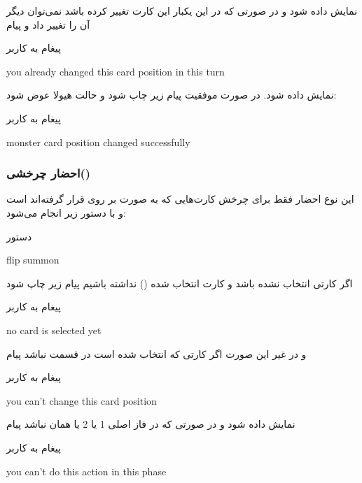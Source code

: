 \documentclass[]{article}
\begin{document}
نمایش داده شود و در صورتی که در این  یکبار  این کارت 
تغییر کرده باشد نمی‌توان دیگر آن را تغییر داد و پیام
\begin{mybox}[colback=yellow]{پیغام به کاربر}
	\begin{latin}	
		you already changed this card position in this turn		
	\end{latin}
\end{mybox}
نمایش داده شود. در صورت موفقیت پیام زیر چاپ شود و حالت هیولا عوض شود:
\begin{mybox}[colback=yellow]{پیغام به کاربر}
	\begin{latin}	
		monster card position changed successfully
	\end{latin}
\end{mybox}

\subsubsection*{{\titr احضار چرخشی()}}
این نوع احضار فقط برای چرخش کارت‌هایی که به صورت  بر روی
  قرار گرفته‌اند است و با دستور زیر انجام می‌شود:
\begin{mybox}[colback=yellow]{دستور}
	\begin{latin}	
	    flip summon	
	\end{latin}
\end{mybox}
    اگر کارتی انتخاب نشده باشد و کارت انتخاب شده () نداشته 
    باشیم پیام زیر چاپ شود
\begin{mybox}[colback=yellow]{پیغام به کاربر}
	\begin{latin}	
		no card is selected yet
	\end{latin}
\end{mybox}
و در غیر این صورت اگر کارتی که انتخاب شده است  در قسمت  
نباشد پیام
\begin{mybox}[colback=yellow]{پیغام به کاربر}
	\begin{latin}	
		you can’t change this card position	
	\end{latin}
\end{mybox}
نمایش داده شود و در صورتی که در فاز اصلی 1 یا 2 یا همان  
نباشد پیام
\begin{mybox}[colback=yellow]{پیغام به کاربر}
	\begin{latin}	
		you can’t do this action in this phase	
	\end{latin}
\end{mybox}
\end{document}
